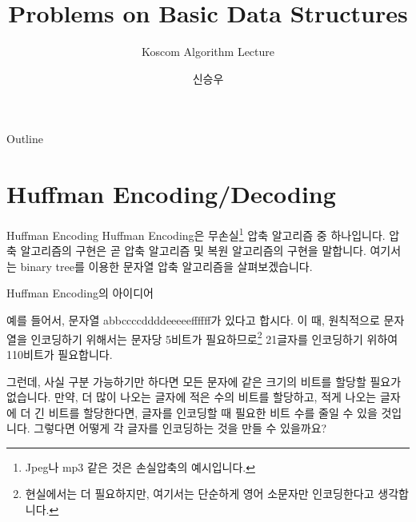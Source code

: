 \documentclass{beamer}
\title{Problems on Basic Data Structures}
\subtitle{Koscom Algorithm Lecture}
\author{신승우}
\begin{document}
\begin{frame}
  \titlepage
\end{frame}

\begin{frame}{Outline}
  \tableofcontents
\end{frame}






\section{Huffman Encoding/Decoding} 


 \begin{frame}{Huffman Encoding}
Huffman Encoding은 무손실\footnote{ Jpeg나 mp3 같은 것은 손실압축의 예시입니다.} 압축 알고리즘 중 하나입니다.  압축 알고리즘의 구현은 곧 압축 알고리즘 및 복원 알고리즘의 구현을 말합니다. 여기서는 binary tree를 이용한 문자열 압축 알고리즘을 살펴보겠습니다. 
 \end{frame}

 \begin{frame}{Huffman Encoding의 아이디어}
 
 예를 들어서, 문자열 abbccccddddeeeeeffffff가 있다고 합시다. 이 때, 원칙적으로 문자열을 인코딩하기 위해서는 문자당 5비트가 필요하므로\footnote{현실에서는 더 필요하지만, 여기서는 단순하게 영어 소문자만 인코딩한다고 생각합니다.} 21글자를 인코딩하기 위하여 110비트가 필요합니다. 
 
 그런데, 사실 구분 가능하기만 하다면 모든 문자에 같은 크기의 비트를 할당할 필요가 없습니다. 만약, 더 많이 나오는 글자에 적은 수의 비트를 할당하고, 적게 나오는 글자에 더 긴 비트를 할당한다면, 글자를 인코딩할 때 필요한 비트 수를 줄일 수 있을 것입니다. 그렇다면 어떻게 각 글자를 인코딩하는 것을 만들 수 있을까요? 

 \end{frame}
 
\end{document}
